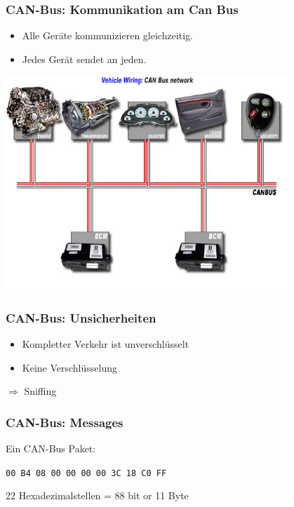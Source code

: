 \documentclass[t]{beamer}
\begin{document}
\begin{frame}
	\frametitle{CAN-Bus: Kommunikation am Can Bus}
	\begin{itemize}
        \item Alle Geräte kommunizieren gleichzeitig.
		\item Jedes Gerät sendet an jeden.
	\end{itemize}
    \begin{center}
        \includegraphics[width=0.8\textwidth]{pic/diag_canbus2.jpg} \ \
    \end{center}
\end{frame}

\begin{frame}
	\frametitle{CAN-Bus: Unsicherheiten}
	\begin{itemize}
        \item Kompletter Verkehr ist unverschlüsselt
		\item Keine Verschlüsselung
	\end{itemize}
    $\Rightarrow$ Sniffing
\end{frame}

\begin{frame}
	\frametitle{CAN-Bus: Messages}
    Ein CAN-Bus Paket:
    \newline
    \newline
    \newline
    \newline
    {\Large \centerline{\texttt{00 B4 08 00 00 00 00 3C 18 C0 FF}}}
    \vspace*{1cm}

    22 Hexadezimalstellen = 88 bit or 11 Byte
\end{frame}
\end{document}

